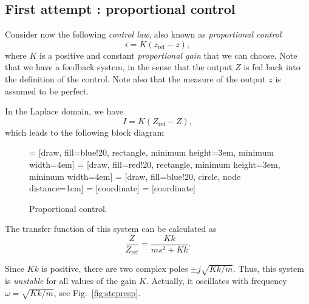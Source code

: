\documentclass[a4paper,11pt]{report}
\theoremstyle{definition}
\newcommand{\re}{\mathrm{ref}}
\begin{document}
\subsection{First attempt : proportional control}

Consider now the following \emph{control law}, also known as
\emph{proportional control}
\[
i = K(z_\re - z),
\]
where $K$ is a positive and constant \emph{proportional gain} that we
can choose. Note that we have a feedback system, in the sense that the
output $Z$ is fed back into the definition of the control. Note also
that the measure of the output $z$ is assumed to be perfect.

In the Laplace domain, we have
\[
I = K\left(Z_\re - Z\right),
\]
which leads to the following block diagram

\begin{figure}[H]
  \label{fig:examplesystem}
  \centering
   = [draw, fill=blue!20, rectangle, minimum height=3em, minimum width=4em]
   = [draw, fill=red!20, rectangle, minimum height=3em, minimum width=4em]
   = [draw, fill=blue!20, circle, node distance=1cm]
   = [coordinate]
   = [coordinate]
  \caption{Proportional control.}
\end{figure}

The transfer function of this system can be calculated as
\[
\frac{Z}{Z_\re} = \frac{Kk}{ms^2+Kk}.
\]

Since $Kk$ is positive, there are two complex poles $\pm
j\sqrt{Kk/m}$. Thus, this system is \emph{unstable} for all values of
the gain $K$. Actually, it oscillates with frequency
$\omega=\sqrt{Kk/m}$, see Fig.~\ref{fig:stepresp}.
\end{document}
